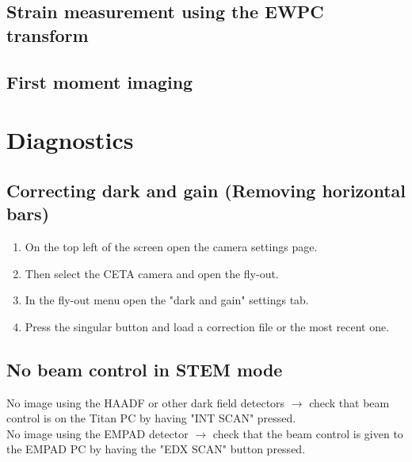 \documentclass[a4paper]{scrartcl}
\begin{document}
\subsection*{Strain measurement using the EWPC transform}

\subsection*{First moment imaging}

\section*{Diagnostics}
\subsection*{Correcting dark and gain (Removing horizontal bars)}
\begin{enumerate}
	\item On the top left of the screen open the camera settings page.
	\item Then select the CETA camera and open the fly-out.
	\item In the fly-out menu open the "dark and gain" settings tab.
	\item Press the singular button and load a correction file or the most recent one.
\end{enumerate}

\subsection*{No beam control in STEM mode}
No image using the HAADF or other dark field detectors $\rightarrow$ check that beam control is on the Titan PC by having "INT SCAN" pressed.\\
No image using the EMPAD detector $\rightarrow$ check that the beam control is given to the EMPAD PC by having the "EDX SCAN" button pressed.\\
\end{document}
